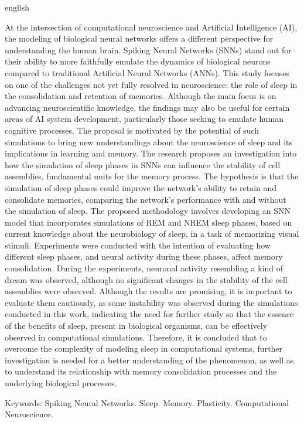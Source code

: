 \begin{resumo}[Abstract]	
\begin{otherlanguage*}{english}
\noindent 
 
At the intersection of computational neuroscience and Artificial Intelligence (AI), the modeling of biological neural networks
offers a different perspective for understanding the human brain. Spiking Neural Networks (SNNs) stand out for their ability to
more faithfully emulate the dynamics of biological neurons compared to traditional Artificial Neural Networks (ANNs). This study
focuses on one of the challenges not yet fully resolved in neuroscience: the role of sleep in the consolidation and retention of
memories. Although the main focus is on advancing neuroscientific knowledge, the findings may also be useful for certain areas of
AI system development, particularly those seeking to emulate human cognitive processes. The proposal is motivated by the potential
of such simulations to bring new understandings about the neuroscience of sleep and its implications in learning and memory. The
research proposes an investigation into how the simulation of sleep phases in SNNs can influence the stability of cell
assemblies, fundamental units for the memory process. The hypothesis is that the simulation of sleep phases could improve the
network's ability to retain and consolidate memories, comparing the network's performance with and without the simulation of
sleep. The proposed methodology involves developing an SNN model that incorporates simulations of REM and NREM sleep phases, based
on current knowledge about the neurobiology of sleep, in a task of memorizing visual stimuli. Experiments were conducted with the
intention of evaluating how different sleep phases, and neural activity during these phases, affect memory consolidation. During
the experiments, neuronal activity resembling a kind of dream was observed, although no significant changes in the stability of
the cell assemblies were observed. Although the results are promising, it is important to evaluate them cautiously, as some
instability was observed during the simulations conducted in this work, indicating the need for further study so that the essence
of the benefits of sleep, present in biological organisms, can be effectively observed in computational simulations. Therefore, it
is concluded that to overcome the complexity of modeling sleep in computational systems, further investigation is needed for a
better understanding of the phenomenon, as well as to understand its relationship with memory consolidation processes and the
underlying biological processes.

\vspace{0.2cm}
Keywords: Spiking Neural Networks. Sleep. Memory. Plasticity. Computational Neuroscience.
\end{otherlanguage*}
\end{resumo}
